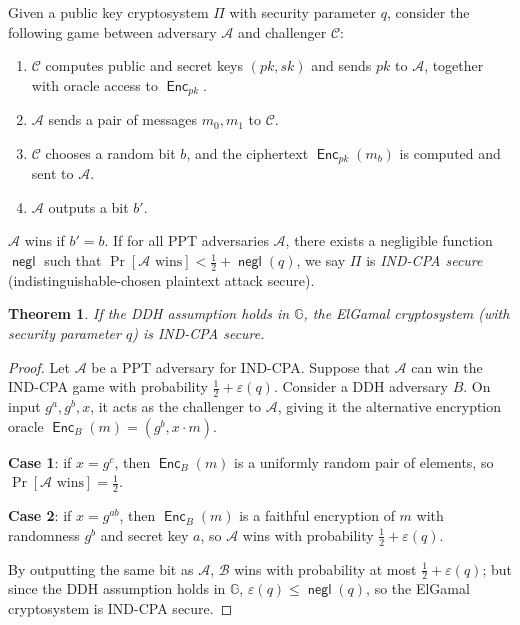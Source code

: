 \documentclass[11pt,twoside,a4paper]{article}
\DeclareMathOperator{\negl}{\mathsf{negl}}
\DeclareMathOperator{\Enc}{\mathsf{Enc}}
\newtheorem{theorem}{Theorem}[section]
\theoremstyle{definition}
\begin{document}
\begin{definition}
    Given a public key cryptosystem \(\Pi\) with security parameter \(q\), consider the following game between adversary \(\mathcal{A}\) and challenger \(\mathcal{C}\):
    \begin{enumerate}
        \item \(\mathcal{C}\) computes public and secret keys \((pk, sk)\) and sends \(pk\) to \(\mathcal{A}\), together with oracle access to \(\Enc_{pk}\).
        \item \(\mathcal{A}\) sends a pair of messages \(m_0, m_1\) to \(\mathcal{C}\).
        \item \(\mathcal{C}\) chooses a random bit \(b\), and the ciphertext \(\Enc_{pk}(m_b)\) is computed and sent to \(\mathcal{A}\).
        \item \(\mathcal{A}\) outputs a bit \(b'\).
    \end{enumerate}
    \(\mathcal{A}\) wins if \(b'=b\). If for all PPT adversaries \(\mathcal{A}\), there exists a negligible function \(\negl\) such that \(\Pr[\mathcal{A}\text{ wins}]<\frac{1}{2}+\negl(q)\), we say \(\Pi\) is \textit{IND-CPA secure} (indistinguishable-chosen plaintext attack secure).
\end{definition}
\begin{theorem}
    If the DDH assumption holds in \(\mathbb{G}\), the ElGamal cryptosystem (with security parameter \(q\)) is IND-CPA secure.
\end{theorem}
\begin{proof}
    Let \(\mathcal{A}\) be a PPT adversary for IND-CPA. Suppose that \(\mathcal{A}\) can win the IND-CPA game with probability \(\frac{1}{2}+\varepsilon(q)\). Consider a DDH adversary \(B\). On input \(g^a, g^b, x\), it acts as the challenger to \(\mathcal{A}\), giving it the alternative encryption oracle \(\Enc_B(m)=(g^b, x\cdot m)\).
    
    \textbf{Case 1}: if \(x=g^c\), then \(\Enc_B(m)\) is a uniformly random pair of elements, so \(\Pr[\mathcal{A}\text{ wins}]=\frac{1}{2}\).
    
    \textbf{Case 2}: if \(x=g^{ab}\), then \(\Enc_B(m)\) is a faithful encryption of \(m\) with randomness \(g^b\) and secret key \(a\), so \(\mathcal{A}\) wins with probability \(\frac{1}{2}+\varepsilon(q)\).

    By outputting the same bit as \(\mathcal{A}\), \(\mathcal{B}\) wins with probability at most \(\frac{1}{2}+\varepsilon(q)\); but since the DDH assumption holds in \(\mathbb{G}\), \(\varepsilon(q)\leq\negl(q)\), so the ElGamal cryptosystem is IND-CPA secure.
\end{proof}
\end{document}
